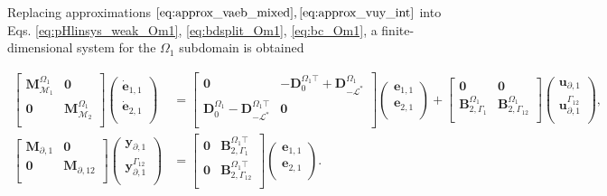 Replacing approximations $\ref{eq:approx_vaeb_mixed}, \ref{eq:approx_vuy_int}$ into Eqs. \ref{eq:pHlinsys_weak_Om1}, \ref{eq:bdsplit_Om1}, \ref{eq:bc_Om1}, a finite-dimensional system for the $\Omega_1$ subdomain is obtained


\begin{equation}\label{eq:pHlinsys_findim_Om1}
\begin{aligned}
\begin{bmatrix}
\mathbf{M}_{\mathcal{M}_1}^{\Omega_1} & \mathbf{0} \\
\mathbf{0} & \mathbf{M}_{\mathcal{M}_2}^{\Omega_1} \\
\end{bmatrix}
\begin{pmatrix}
\dot{\mathbf{e}}_{1, 1} \\
\dot{\mathbf{e}}_{2, 1} \\
\end{pmatrix}
&= \begin{bmatrix}
\mathbf{0} & -\mathbf{D}_{0}^{\Omega_1 \top}+ \mathbf{D}_{-\mathcal{L}^*}^{\Omega_1} \\
\mathbf{D}_{0}^{\Omega_1} - \mathbf{D}_{-\mathcal{L}^*}^{\Omega_1 \top} & \mathbf{0} \\
\end{bmatrix} 
\begin{pmatrix}
\mathbf{e}_{1, 1} \\
\mathbf{e}_{2, 1} \\
\end{pmatrix} + 
\begin{bmatrix}
\mathbf{0} & \mathbf{0}\\
\mathbf{B}_{2, \Gamma_1}^{\Omega_1} & \mathbf{B}_{2, \Gamma_{12}}^{\Omega_1}\\
\end{bmatrix}
\begin{pmatrix}
\mathbf{u}_{\partial, 1} \\
\mathbf{u}_{\partial, 1}^{\Gamma_{12}} \\
\end{pmatrix}, \\
\begin{bmatrix}
\mathbf{M}_{\partial, 1} & \mathbf{0}  \\
\mathbf{0} & \mathbf{M}_{\partial, 12} \\
\end{bmatrix}
\begin{pmatrix}
\mathbf{y}_{\partial, 1} \\
\mathbf{y}_{\partial, 1}^{\Gamma_{12}} \\
\end{pmatrix}
  &= 
\begin{bmatrix}
\mathbf{0} & \mathbf{B}_{2, \Gamma_1}^{\Omega_1 \top}\\
\mathbf{0} & \mathbf{B}_{2, \Gamma_{12}}^{\Omega_1 \top} \\
\end{bmatrix}\begin{pmatrix}
\mathbf{e}_{1, 1} \\
\mathbf{e}_{2, 1} \\
\end{pmatrix}.
\end{aligned}
\end{equation}
